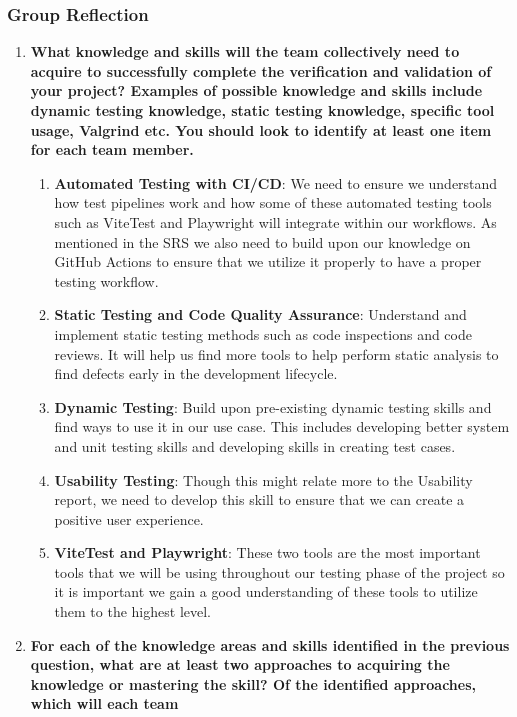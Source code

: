 \documentclass[12pt, titlepage]{article}
\begin{document}
\subsubsection*{Group Reflection}
\begin{enumerate}

  \item \textbf{What knowledge and skills will the team collectively need to acquire to successfully complete the verification and validation of your project?
  Examples of possible knowledge and skills include dynamic testing knowledge, static testing knowledge, specific tool usage, Valgrind etc.  You should look to identify at least one item for each team member.}
  \begin {enumerate}
    \item \textbf{Automated Testing with CI/CD}: We need to ensure we understand how test pipelines work and how some of these automated testing tools such as ViteTest and Playwright will integrate within our workflows. As mentioned in the SRS we also need to build upon our knowledge on GitHub Actions to ensure that we utilize it properly to have a proper testing workflow.
    \item \textbf{Static Testing and Code Quality Assurance}: Understand and implement static testing methods such as code inspections and code reviews. It will help us find more tools to help perform static analysis to find defects early in the development lifecycle.
    \item \textbf{Dynamic Testing}: Build upon pre-existing dynamic testing skills and find ways to use it in our use case. This includes developing better system and unit testing skills and developing skills in creating test cases.
    \item \textbf{Usability Testing}: Though this might relate more to the Usability report, we need to develop this skill to ensure that we can create a positive user experience.
    \item \textbf{ViteTest and Playwright}: These two tools are the most important tools that we will be using throughout our testing phase of the project so it is important we gain a good understanding of these tools to utilize them to the highest level.
  \end{enumerate}
  \item \textbf{For each of the knowledge areas and skills identified in the previous
  question, what are at least two approaches to acquiring the knowledge or
  mastering the skill?  Of the identified approaches, which will each team
}
\end{enumerate}
\end{document}
